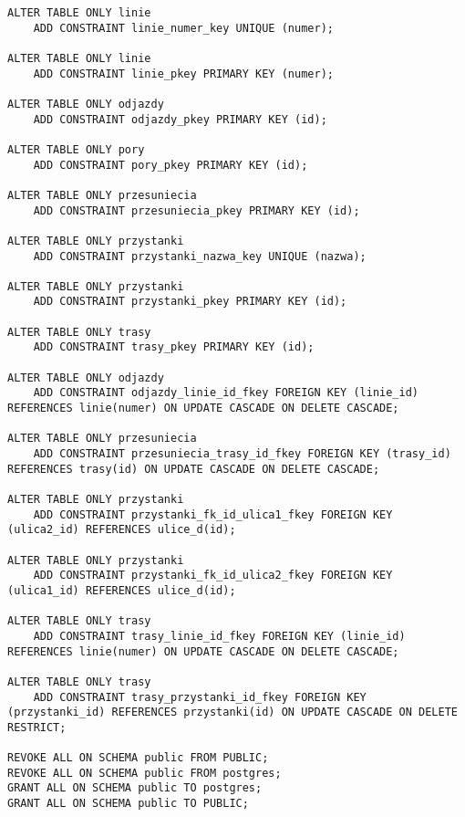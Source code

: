 \begin{lstlisting}
ALTER TABLE ONLY linie
    ADD CONSTRAINT linie_numer_key UNIQUE (numer);

ALTER TABLE ONLY linie
    ADD CONSTRAINT linie_pkey PRIMARY KEY (numer);

ALTER TABLE ONLY odjazdy
    ADD CONSTRAINT odjazdy_pkey PRIMARY KEY (id);

ALTER TABLE ONLY pory
    ADD CONSTRAINT pory_pkey PRIMARY KEY (id);

ALTER TABLE ONLY przesuniecia
    ADD CONSTRAINT przesuniecia_pkey PRIMARY KEY (id);

ALTER TABLE ONLY przystanki
    ADD CONSTRAINT przystanki_nazwa_key UNIQUE (nazwa);

ALTER TABLE ONLY przystanki
    ADD CONSTRAINT przystanki_pkey PRIMARY KEY (id);

ALTER TABLE ONLY trasy
    ADD CONSTRAINT trasy_pkey PRIMARY KEY (id);

ALTER TABLE ONLY odjazdy
    ADD CONSTRAINT odjazdy_linie_id_fkey FOREIGN KEY (linie_id) REFERENCES linie(numer) ON UPDATE CASCADE ON DELETE CASCADE;

ALTER TABLE ONLY przesuniecia
    ADD CONSTRAINT przesuniecia_trasy_id_fkey FOREIGN KEY (trasy_id) REFERENCES trasy(id) ON UPDATE CASCADE ON DELETE CASCADE;

ALTER TABLE ONLY przystanki
    ADD CONSTRAINT przystanki_fk_id_ulica1_fkey FOREIGN KEY (ulica2_id) REFERENCES ulice_d(id);

ALTER TABLE ONLY przystanki
    ADD CONSTRAINT przystanki_fk_id_ulica2_fkey FOREIGN KEY (ulica1_id) REFERENCES ulice_d(id);

ALTER TABLE ONLY trasy
    ADD CONSTRAINT trasy_linie_id_fkey FOREIGN KEY (linie_id) REFERENCES linie(numer) ON UPDATE CASCADE ON DELETE CASCADE;

ALTER TABLE ONLY trasy
    ADD CONSTRAINT trasy_przystanki_id_fkey FOREIGN KEY (przystanki_id) REFERENCES przystanki(id) ON UPDATE CASCADE ON DELETE RESTRICT;

REVOKE ALL ON SCHEMA public FROM PUBLIC;
REVOKE ALL ON SCHEMA public FROM postgres;
GRANT ALL ON SCHEMA public TO postgres;
GRANT ALL ON SCHEMA public TO PUBLIC;

\end{lstlisting}



